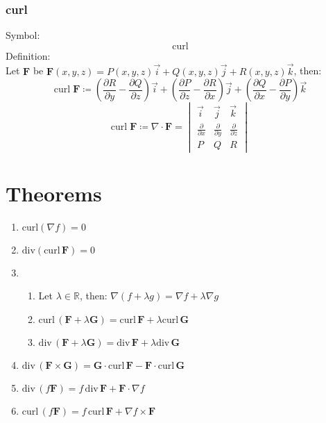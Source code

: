 \documentclass[12pt, fleqn]{book}
\begin{document}
    	\subsubsection{curl}
    		Symbol:
    		\begin{equation}
    			\mathrm{curl}
    		\end{equation}
    		Definition: \\
    		Let $\mathbf{F}$ be $\mathbf{F}(x, y, z) = P(x, y, z)\vec{i} + Q(x, y, z)\vec{j} + R(x, y, z)\vec{k}$, then:
    		\begin{equation}
    			\mathrm{curl} \; \mathbf{F} \coloneqq (\frac{\partial R}{\partial y} - \frac{\partial Q}{\partial z})\vec{i} + (\frac{\partial P}{\partial z} - \frac{\partial R}{\partial x})\vec{j} + (\frac{\partial Q}{\partial x} - \frac{\partial P}{\partial y})\vec{k} 
     		\end{equation}
     		\begin{equation}
     			\mathrm{curl} \; \mathbf{F} \coloneqq \nabla \cdot \mathbf{F} = 
     			\begin{vmatrix}
     				\vec{i} & \vec{j} & \vec{k} \\
     				\frac{\partial}{\partial x} &  \frac{\partial}{\partial y} & \frac{\partial}{\partial z} \\
     				P & Q & R
     			\end{vmatrix}
     		\end{equation}
     	\section{Theorems}
     		\begin{enumerate}
     			\item $\mathrm{curl}(\nabla f) = 0$
     			\item $\mathrm{div}(\mathrm{curl} \, \mathbf{F}) = 0$
                \item \begin{enumerate}
     					\item Let $\lambda \in \mathbb{R}$, then: $\nabla(f + \lambda g) = \nabla f + \lambda \nabla g$
		     			\item $\mathrm{curl} \, (\mathbf{F} + \lambda \mathbf{G}) = \mathrm{curl} \, \mathbf{F} + \lambda\mathrm{curl} \, \mathbf{G}$
		     			\item $\mathrm{div} \, (\mathbf{F} + \lambda \mathbf{G}) = \mathrm{div} \, \mathbf{F} + \lambda\mathrm{div} \, \mathbf{G}$
     			\end{enumerate}
     			\item $\mathrm{div} \, (\mathbf{F} \times \mathbf{G}) = \mathbf{G} \cdot \mathrm{curl} \, \mathbf{F} - \mathbf{F} \cdot \mathrm{curl} \, \mathbf{G}$
     			\item $\mathrm{div} \, (f \mathbf{F}) = f \, \mathrm{div} \, \mathbf{F} + \mathbf{F} \cdot \nabla f$
     			\item $\mathrm{curl} \, (f \mathbf{F}) = f \, \mathrm{curl} \, \mathbf{F} + \nabla f \times \mathbf{F}$
     		\end{enumerate}
\end{document}
